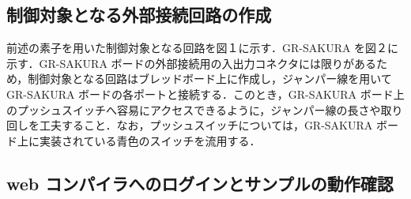 \documentclass {ujarticle}
\begin{document}
 \subsection{制御対象となる外部接続回路の作成}
 前述の素子を用いた制御対象となる回路を図１に示す．GR-SAKURA を図２に示す．GR-SAKURA ボードの外部接続用の入出力コネクタには限りがあるため，制御対象となる回路はブレッドボード上に作成し，ジャンパー線を用いて GR-SAKURA ボードの各ポートと接続する．このとき，GR-SAKURA ボード上のプッシュスイッチへ容易にアクセスできるように，ジャンパー線の長さや取り回しを工夫すること．なお，プッシュスイッチについては，GR-SAKURA ボード上に実装されている青色のスイッチを流用する．
 
 \subsection{web コンパイラへのログインとサンプルの動作確認}
 
 
\end{document}
